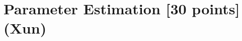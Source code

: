 \documentclass{article}
\newcommand{\Ncal}{\mathcal{N}}
\begin{document}
\newpage


\section{Parameter Estimation [30 points] (Xun)}









\end{document}

